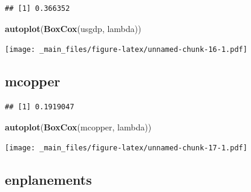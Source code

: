 \documentclass[]{book}
\newenvironment{Shaded}{\begin{snugshade}}{\end{snugshade}}
\newcommand{\KeywordTok}[1]{\textcolor[rgb]{0.13,0.29,0.53}{\textbf{#1}}}
\newcommand{\NormalTok}[1]{#1}
\newcommand{\OperatorTok}[1]{\textcolor[rgb]{0.81,0.36,0.00}{\textbf{#1}}}
\newcommand{\StringTok}[1]{\textcolor[rgb]{0.31,0.60,0.02}{#1}}
\begin{document}
\begin{verbatim}
## [1] 0.366352
\end{verbatim}

\begin{Shaded}
\begin{Highlighting}[]
\KeywordTok{autoplot}\NormalTok{(}\KeywordTok{BoxCox}\NormalTok{(usgdp, lambda))}
\end{Highlighting}
\end{Shaded}

\texttt{[image: \_main\_files/figure-latex/unnamed-chunk-16-1.pdf]}

\hypertarget{mcopper}{%
\subsection{mcopper}\label{mcopper}}

\begin{Shaded}
\end{Shaded}

\begin{verbatim}
## [1] 0.1919047
\end{verbatim}

\begin{Shaded}
\begin{Highlighting}[]
\KeywordTok{autoplot}\NormalTok{(}\KeywordTok{BoxCox}\NormalTok{(mcopper, lambda))}
\end{Highlighting}
\end{Shaded}

\texttt{[image: \_main\_files/figure-latex/unnamed-chunk-17-1.pdf]}

\hypertarget{enplanements}{%
\subsection{enplanements}\label{enplanements}}

\begin{Shaded}
\end{Shaded}
\end{document}
